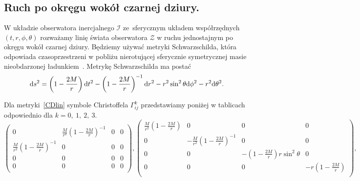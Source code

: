 \subsection{Ruch po okręgu wokół czarnej dziury.}
W układzie obserwatora inercjalnego $\mathcal{I}$ ze~sferycznym układem
współrzędnych $(t,r,\phi,\theta)$ rozważamy linię świata 
obserwatora $\mathcal{Z}$ w ruchu jednostajnym po okręgu wokół czarnej dziury.
Będziemy używać metryki Schwarzschilda, która odpowiada 
czasoprzestrzeni w pobliżu nierotującej sferycznie symetrycznej masie 
nieobdarzonej ładunkiem~\cite{hartle2016}. 
Metrykę Schwarzschilda ma postać
\begin{align} \label{CDlin}
\text{d} s^2 = 
 \left(1-\frac{2 M}{r}\right) \text{d} t^2 
 -\left(1-\frac{2 M}{r}\right)^{-1} \text{d} r^2 
 -r^2 \sin ^2\theta\text{d} \phi^2 
 -r^2 \text{d} \theta^2.
\end{align}
\begin{comment}
\begin{align}\nonumber
(g_{\mu\nu}) = \left(
\begin{array}{cccc}
 1-\frac{2 M}{r} & 0 & 0 & 0 \\
 0 & -\left(1-\frac{2 M}{r}\right)^{-1} & 0 & 0 \\
 0 & 0 & -r^2 \sin ^2\theta  & 0 \\
 0 & 0 & 0 & -r^2 \\
\end{array}
\right).
\end{align}
\end{comment}
Dla metryki~\eqref{CDlin} symbole Christoffela $\Gamma^k _{ij}$ 
przedstawiamy poniżej w tablicach odpowiednio dla $k=0,\ 1,\ 2,\ 3$.
$$
\left(
\begin{array}{cccc}
 0 & \frac{M}{r^2}\left( 1 - \frac{2M}{r}  \right)^{-1}& 0 & 0 \\
 \frac{M}{r^2}\left( 1 - \frac{2M}{r}  \right)^{-1} & 0 & 0 & 0 \\
 0 & 0 & 0 & 0 \\
 0 & 0 & 0 & 0 \\
\end{array}
\right),\left(
\begin{array}{cccc}
 \frac{M}{r^2}\left( 1 - \frac{2M}{r}  \right) & 0 & 0 & 0 \\
 0 &-\frac{M}{r^2}\left( 1 - \frac{2M}{r}  \right)^{-1} & 0 & 0 \\
 0 & 0 & -\left(1-\frac{2M}{r}\right)r \sin ^2\theta  & 0 \\
 0 & 0 & 0 & -r \left(1-\frac{2M}{r}\right) \\
\end{array}
\right),
$$
